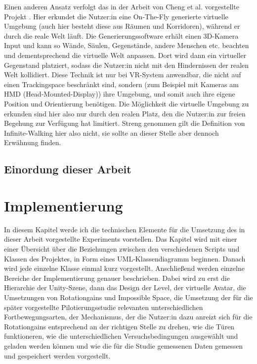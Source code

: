Einen anderen Ansatz verfolgt das in der Arbeit \cite{microsoft} von Cheng et al. vorgestellte Projekt .
Hier erkundet die Nutzer:in eine On-The-Fly generierte virtuelle Umgebung (auch hier besteht diese aus Räumen und Korridoren), während er durch die reale Welt läuft. Die Generierungssoftware erhält einen 3D-Kamera Input und kann so Wände, Säulen, Gegenstände, andere Menschen etc. beachten und dementsprechend die virtuelle Welt anpassen. Dort wird dann ein virtueller Gegenstand platziert, sodass die Nutzer:in nicht mit den Hindernissen der realen Welt kollidiert.
Diese Technik ist nur bei VR-System anwendbar, die nicht auf einen Trackingspace beschränkt sind, sondern (zum Beispiel mit Kameras am HMD (Head-Mounted-Display)) ihre Umgebung, und somit auch ihre eigene Position und Orientierung benötigen. Die Möglichkeit die virtuelle Umgebung zu erkunden sind hier also nur durch den realen Platz, den die Nutzer:in zur freien Begehung zur Verfügung hat limitiert. Streng genommen gilt die Definition von Infinite-Walking hier also nicht, sie sollte an dieser Stelle aber dennoch Erwähnung finden.

\section{Einordung dieser Arbeit}

\chapter{Implementierung}\label{chapter:implementation}

In diesem Kapitel werde ich die technischen Elemente für die Umsetzung des in dieser Arbeit vorgestellte Experiments vorstellen.
Das Kapitel wird mit einer einer Übersicht über die Beziehungen zwischen den verschiedenen Scripts und Klassen des Projektes, in Form eines UML-Klassendiagramm beginnen. Danach wird jede einzelne Klasse einmal kurz vorgestellt. Anschließend werden einzelne Bereiche der Implementierung genauer beschrieben. Dabei wird zu erst die Hierarchie der Unity-Szene, dann das Design der Level, der virtuelle Avatar, die Umsetzungen von Rotationgains und Impossible Space, die Umsetzung der für die später vorgestellte Pilotierungsstudie relevanten unterschiedlichen Fortbewegungsarten, der Mechanismus, der die Nutzer:in dazu anreizt sich für die Rotationgains entsprechend an der richtigen Stelle zu drehen, wie die Türen funktioneren, wie die unterschiedlichen Versuchsbedingungen ausgewählt und geladen werden können und wie die für die Studie gemessenen Daten gemessen und gespeichert werden vorgestellt.

